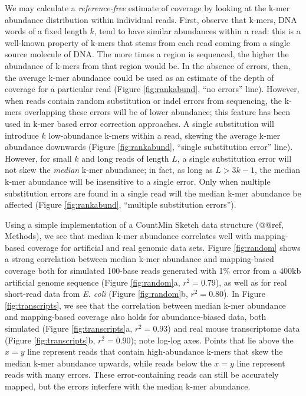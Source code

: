 \documentclass[10pt]{article}
\begin{document}
We may calculate a {\em reference-free} estimate of coverage by
looking at the k-mer abundance distribution within individual reads.
First, observe that k-mers, DNA words of a fixed length $k$, tend to
have similar abundances within a read: this is a well-known property
of k-mers that stems from each read coming from a single source
molecule of DNA.  The more times a region is sequenced, the higher the
abundance of k-mers from that region would be.  In the absence of
errors, then, the average k-mer abundance could be used as an estimate
of the depth of coverage for a particular read (Figure
\ref{fig:rankabund}, ``no errors'' line).  However, when reads contain
random substitution or indel errors from sequencing, the k-mers
overlapping these errors will be of lower abundance; this feature has
been used in k-mer based error correction approaches.  A single
substitution will introduce $k$ low-abundance k-mers within a read,
skewing the average k-mer abundance downwards (Figure
\ref{fig:rankabund}, ``single substitution error'' line).  However,
for small $k$ and long reads of length $L$, a single substitution
error will not skew the {\em median} k-mer abundance; in fact, as long
as $L > 3k-1$, the median k-mer abundance will be insensitive to a
single error.  Only when multiple substitution errors are found in a
single read will the median k-mer abundance be affected (Figure
\ref{fig:rankabund}, ``multiple substitution errors'').

Using a simple implementation of a CountMin Sketch data structure
(@@ref, Methods), we see that median k-mer abundance correlates well
with mapping-based coverage for artificial and real genomic data sets.
Figure \ref{fig:random} shows a strong correlation between median k-mer abundance and
mapping-based coverage both for simulated 100-base reads generated with 1\%
error from a 400kb artificial genome sequence (Figure \ref{fig:random}a, $r^2 =
0.79$), as well as for real short-read data from {\em E. coli} (Figure
\ref{fig:random}b, $r^2 = 0.80$).  In Figure \ref{fig:transcripts}, we see that the correlation between
median k-mer abundance and mapping-based coverage also holds for
abundance-biased data, both simulated (Figure \ref{fig:transcripts}a, $r^2 = 0.93$) and
real mouse transcriptome data (Figure \ref{fig:transcripts}b, $r^2 = 0.90$); note log-log
axes.  Points that lie above the $x=y$ line represent reads that
contain high-abundance k-mers that skew the median k-mer abundance
upwards, while reads below the $x=y$ line represent reads with many
errors.  These error-containing reads can still be accurately mapped,
but the errors interfere with the median k-mer abundance.
\end{document}
